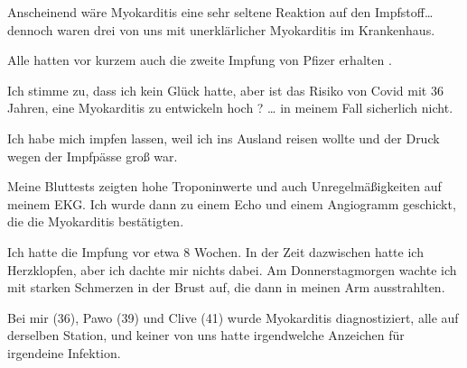 

Anscheinend wäre Myokarditis eine sehr seltene Reaktion auf den Impfstoff… dennoch waren drei von uns mit unerklärlicher Myokarditis im Krankenhaus.

Alle hatten vor kurzem auch die zweite Impfung von Pfizer erhalten .

Ich stimme zu, dass ich kein Glück hatte, aber ist das Risiko von Covid mit 36 Jahren, eine Myokarditis zu entwickeln hoch ? … in meinem Fall sicherlich nicht.

Ich habe mich impfen lassen, weil ich ins Ausland reisen wollte und der Druck wegen der Impfpässe groß war.

Meine Bluttests zeigten hohe Troponinwerte und auch Unregelmäßigkeiten auf meinem EKG. Ich wurde dann zu einem Echo und einem Angiogramm geschickt, die die Myokarditis bestätigten.

Ich hatte die Impfung vor etwa 8 Wochen. In der Zeit dazwischen hatte ich Herzklopfen, aber ich dachte mir nichts dabei. Am Donnerstagmorgen wachte ich mit starken Schmerzen in der Brust auf, die dann in meinen Arm ausstrahlten.

Bei mir (36), Pawo (39) und Clive (41) wurde Myokarditis diagnostiziert, alle auf derselben Station, und keiner von uns hatte irgendwelche Anzeichen für irgendeine Infektion.
